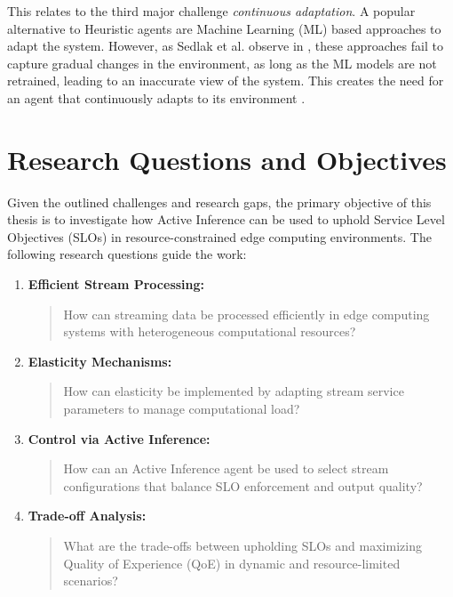 This relates to the third major challenge \textit{continuous adaptation}\cite{danilenka_adaptive_2025}. A popular alternative to Heuristic agents are Machine Learning (ML) based approaches to adapt the system. However, as Sedlak et al. observe in \cite{sedlak_active_2024}, these approaches fail to capture gradual changes in the environment, as long as the ML models are not retrained, leading to an inaccurate view of the system. This creates the need for an agent that continuously adapts to its environment \cite{sedlak_equilibrium_2024}.


\section{Research Questions and Objectives}
\label{sec:research-question}

Given the outlined challenges and research gaps, the primary objective of this thesis is to investigate how Active Inference can be used to uphold Service Level Objectives (SLOs) in resource-constrained edge computing environments. The following research questions guide the work:

\begin{enumerate}
    \item \textbf{Efficient Stream Processing:} 
    \begin{quote}
        How can streaming data be processed efficiently in edge computing systems with heterogeneous computational resources?
    \end{quote}
    
    \item \textbf{Elasticity Mechanisms:}
    \begin{quote}
        How can elasticity be implemented by adapting stream service parameters to manage computational load?
    \end{quote}
    
    \item \textbf{Control via Active Inference:}
    \begin{quote}
        How can an Active Inference agent be used to select stream configurations that balance SLO enforcement and output quality?
    \end{quote}
    
    \item \textbf{Trade-off Analysis:}
    \begin{quote}
        What are the trade-offs between upholding SLOs and maximizing Quality of Experience (QoE) in dynamic and resource-limited scenarios?
    \end{quote}
\end{enumerate}

